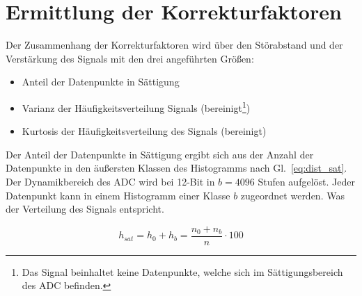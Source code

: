 \section{Ermittlung der Korrekturfaktoren}
Der Zusammenhang der Korrekturfaktoren wird über den Störabstand und der Verstärkung des Signals mit den drei angeführten Größen: 

\begin{itemize}
	\item Anteil der Datenpunkte in Sättigung %
	\item Varianz der Häufigkeitsverteilung Signals (bereinigt\footnote[1]{Das Signal beinhaltet keine Datenpunkte, welche sich im Sättigungsbereich des ADC befinden.\label{foot:bereinigt}})
	\item Kurtosis der Häufigkeitsverteilung des Signals (bereinigt)
	\end{itemize}


Der Anteil der Datenpunkte in Sättigung ergibt sich aus der Anzahl der Datenpunkte in den äußersten Klassen des Histogramms nach Gl.~\eqref{eq:dist_sat}. Der Dynamikbereich des ADC wird bei 12-Bit in $b=4096$ Stufen aufgelöst. Jeder Datenpunkt kann in einem Histogramm einer Klasse $b$ zugeordnet werden. Was der Verteilung des Signals entspricht. 

\begin{equation}
	\label{eq:dist_sat}
	h_{sat} = h_0 + h_b = \frac{n_0 + n_b}{n} \cdot 100
\end{equation}




